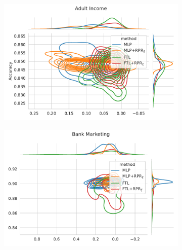 \begin{figure}
\centering
\caption{Metric distribution optimizing Acc. and Equal Opportunity in comparison with Redlining Penalty Regularization across multiple resample runs. Corresponding values available at Table~\ref{tab:complete_acc_opportunity_rpr}.}
\label{fig:complete_mcc_apportunity_rpr}
\begin{subfigure}{.45\linewidth}
    \includegraphics[width=1\linewidth]{images/pareto_acc_opportunity_adult_rpr.pdf}
\end{subfigure}
\begin{subfigure}{.45\linewidth}
    \includegraphics[width=1\linewidth]{images/pareto_acc_opportunity_bank_rpr.pdf}
\end{subfigure}


\end{figure}
